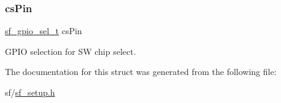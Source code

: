 \subsubsection{\texorpdfstring{csPin}{csPin}}
{\footnotesize\ttfamily \mbox{\hyperlink{structsf__gpio__sel__t}{sf\+\_\+gpio\+\_\+sel\+\_\+t}} cs\+Pin}

G\+P\+IO selection for SW chip select. 

The documentation for this struct was generated from the following file\+:\begin{DoxyCompactItemize}
\item 
sf/\mbox{\hyperlink{sf__setup_8h}{sf\+\_\+setup.\+h}}\end{DoxyCompactItemize}
